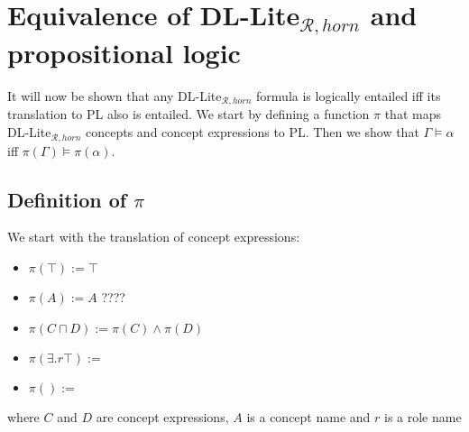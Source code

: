 \chapter{Equivalence of DL-Lite$_{\mathcal{R}, horn}$ and propositional logic}

It will now be shown that any DL-Lite$_{\mathcal{R}, horn}$ formula is logically entailed iff its translation to PL also is entailed. We start by defining a function $\pi$ that maps DL-Lite$_{\mathcal{R}, horn}$ concepts and concept expressions to PL. Then we show that $\Gamma \models \alpha$ iff $\pi(\Gamma) \models \pi(\alpha)$.

\section{Definition of $\pi$}
We start with the translation of concept expressions:
\begin{itemize}
    \item $\pi(\top) := \top$
    \item $\pi(A) := A$ ????
    \item $\pi(C \sqcap D) := \pi(C) \wedge \pi(D)$
    \item $\pi(\exists .r\top) := $
    \item $\pi() := $
\end{itemize}
 where $C$ and $D$ are concept expressions, $A$ is a concept name and $r$ is a role name